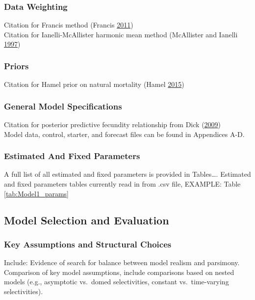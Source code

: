 \documentclass[12pt,]{article}
\begin{document}
\subsubsection{Data Weighting}\label{data-weighting}

Citation for Francis method (Francis
\protect\hyperlink{ref-Francis2011}{2011})\\
Citation for Ianelli-McAllister harmonic mean method (McAllister and
Ianelli \protect\hyperlink{ref-McAllister1997}{1997})

\subsubsection{Priors}\label{priors}

Citation for Hamel prior on natural mortality (Hamel
\protect\hyperlink{ref-Hamel2015}{2015})

\subsubsection{General Model
Specifications}\label{general-model-specifications}

Citation for posterior predictive fecundity relationship from Dick
(\protect\hyperlink{ref-Dick2009}{2009})\\
Model data, control, starter, and forecast files can be found in
Appendices A-D.

\subsubsection{Estimated And Fixed
Parameters}\label{estimated-and-fixed-parameters}

A full list of all estimated and fixed parameters is provided in
Tables\ldots{}. Estimated and fixed parameters tables currently read in
from .csv file, EXAMPLE: Table \ref{tab:Model1_params}

\subsection{Model Selection and
Evaluation}\label{model-selection-and-evaluation}

\subsubsection{Key Assumptions and Structural
Choices}\label{key-assumptions-and-structural-choices}

Include: Evidence of search for balance between model realism and
parsimony.\\
Comparison of key model assumptions, include comparisons based on nested
models (e.g., asymptotic vs.~domed selectivities, constant
vs.~time-varying selectivities).
\end{document}
